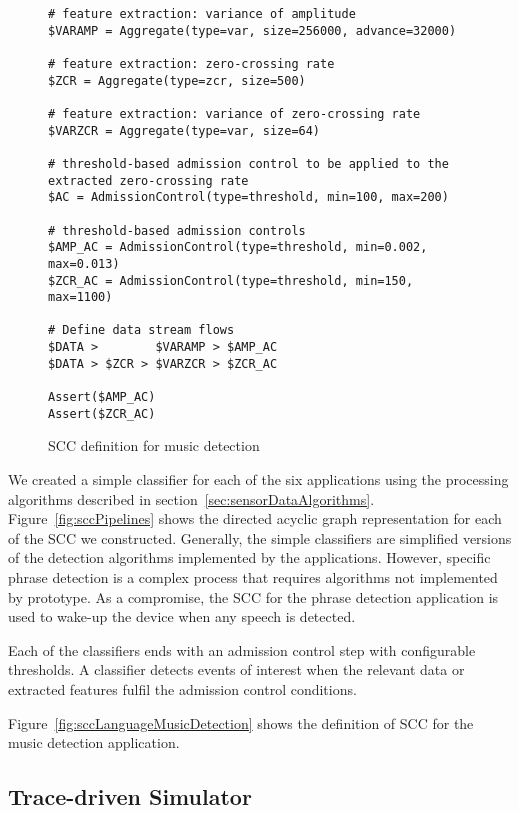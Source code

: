 \begin{figure*}[t]
{\small
	\begin{verbatim}
# feature extraction: variance of amplitude 
$VARAMP = Aggregate(type=var, size=256000, advance=32000)

# feature extraction: zero-crossing rate 
$ZCR = Aggregate(type=zcr, size=500)

# feature extraction: variance of zero-crossing rate 
$VARZCR = Aggregate(type=var, size=64)

# threshold-based admission control to be applied to the extracted zero-crossing rate
$AC = AdmissionControl(type=threshold, min=100, max=200)

# threshold-based admission controls
$AMP_AC = AdmissionControl(type=threshold, min=0.002, max=0.013)
$ZCR_AC = AdmissionControl(type=threshold, min=150, max=1100)

# Define data stream flows
$DATA >        $VARAMP > $AMP_AC
$DATA > $ZCR > $VARZCR > $ZCR_AC

Assert($AMP_AC)
Assert($ZCR_AC)
	\end{verbatim}
}
	\caption{SCC definition for music detection}
    \label{fig:sccLanguageMusicDetectionOld}
\end{figure*}

We created a simple classifier for each of the six applications using
the processing algorithms described in section~\ref{sec:sensorDataAlgorithms}. 
Figure~\ref{fig:sccPipelines} shows the directed acyclic graph representation
for each of the SCC we constructed.  Generally, the simple classifiers are 
simplified versions of the detection algorithms implemented by the
applications.  However, specific
phrase detection is a complex process that requires algorithms not implemented
by prototype.  As a compromise, the SCC for the phrase detection application
is used to wake-up the device when any speech is detected.

Each of the classifiers ends with an admission control step with configurable 
thresholds.  A classifier detects events of interest when the relevant
data or extracted features fulfil the admission control conditions.  

Figure~\ref{fig:sccLanguageMusicDetection} shows the definition of SCC
for the music detection application.  


\subsection{Trace-driven Simulator}

